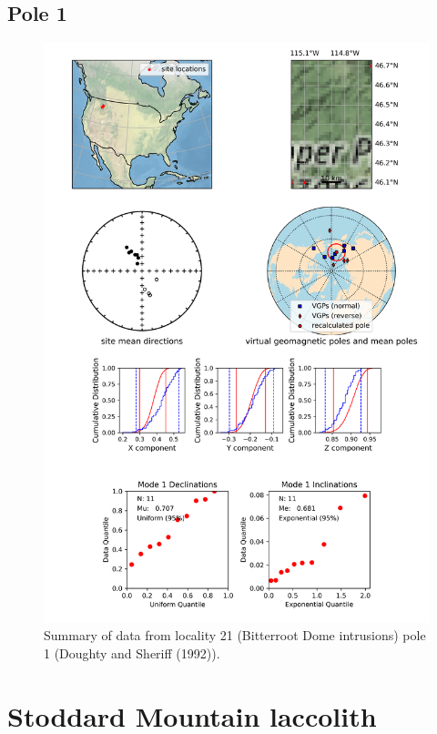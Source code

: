 \documentclass{article}
\begin{document}
\subsection{Pole 1}


\begin{figure}[H]
\centering
\includegraphics[width=5 in]{./21/1/pole_summary.png}
\caption{Summary of data from locality 21 (Bitterroot Dome intrusions) pole 1 (Doughty and Sheriff (1992)).}
\end{figure}

\section{Stoddard Mountain laccolith}
\end{document}
